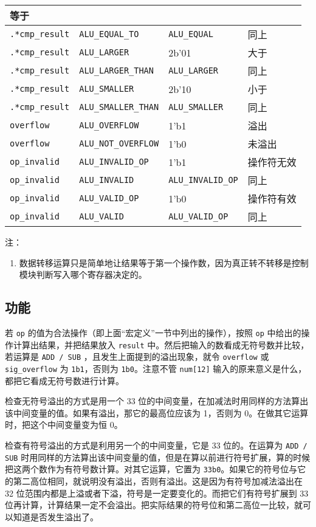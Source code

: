 \documentclass[12pt,AutoFakeBold,AutoFakeSlant]{article}
\providecommand{\tightlist}{%
  \setlength{\itemsep}{0pt}\setlength{\parskip}{0pt}}
\newcommand{\ms}[1]{\texttt{#1}}
\begin{document}
\begin{longtable}[]{@{}|l|l|l|l|@{}}
等于\tabularnewline\hline
\texttt{.*cmp\_result} & \texttt{ALU\_EQUAL\_TO} & \texttt{ALU\_EQUAL} &
同上\tabularnewline\hline
\texttt{.*cmp\_result} & \texttt{ALU\_LARGER} & 2b'01 &
大于\tabularnewline\hline
\texttt{.*cmp\_result} & \texttt{ALU\_LARGER\_THAN} &
\texttt{ALU\_LARGER} & 同上\tabularnewline\hline
\texttt{.*cmp\_result} & \texttt{ALU\_SMALLER} & 2b'10 &
小于\tabularnewline\hline
\texttt{.*cmp\_result} & \texttt{ALU\_SMALLER\_THAN} &
\texttt{ALU\_SMALLER} & 同上\tabularnewline\hline
\texttt{overflow} & \texttt{ALU\_OVERFLOW} & 1'b1 & 溢出\tabularnewline\hline
\texttt{overflow} & \texttt{ALU\_NOT\_OVERFLOW} & 1'b0 &
未溢出\tabularnewline\hline
\texttt{op\_invalid} & \texttt{ALU\_INVALID\_OP} & 1'b1 &
操作符无效\tabularnewline\hline
\texttt{op\_invalid} & \texttt{ALU\_INVALID} & \texttt{ALU\_INVALID\_OP}
& 同上\tabularnewline\hline
\texttt{op\_invalid} & \texttt{ALU\_VALID\_OP} & 1'b0 &
操作符有效\tabularnewline\hline
\texttt{op\_invalid} & \texttt{ALU\_VALID} & \texttt{ALU\_VALID\_OP} &
同上\tabularnewline\hline

\end{longtable}

注：

\begin{enumerate}
\def\labelenumi{\arabic{enumi}.}
\tightlist
\item
  数据转移运算只是简单地让结果等于第一个操作数，因为真正转不转移是控制模块判断写入哪个寄存器决定的。
\end{enumerate}

\hypertarget{ux529fux80fd-7}{%
\subsection{功能}\label{ux529fux80fd-7}}

若 \texttt{op} 的值为合法操作（即上面``宏定义''一节中列出的操作），按照
\texttt{op} 中给出的操作计算出结果，并把结果放入 \texttt{result}
中。然后把输入的数看成无符号数并比较，若运算是 \ms{ADD / SUB} ，且发生上面提到的溢出现象，就令
\texttt{overflow} 或 \texttt{sig\_overflow} 为
\texttt{1\textquotesingle{}b1}，否则为
\texttt{1\textquotesingle{}b0}。注意不管 \texttt{num{[}12{]}}
输入的原来意义是什么，都把它看成无符号数进行计算。

检查无符号溢出的方式是用一个 33 位的中间变量，在加减法时用同样的方法算出该中间变量的值。如果有溢出，那它的最高位应该为 1，否则为 0。在做其它运算时，把这个中间变量变为恒 0。

检查有符号溢出的方式是利用另一个的中间变量，它是 33
位的。在运算为 \ms{ADD / SUB} 时用同样的方法算出该中间变量的值，但是在算以前进行符号扩展，算的时候把这两个数作为有符号数计算。对其它运算，它置为 \texttt{33\textquotesingle{}b0}。如果它的符号位与它的第二高位相同，就说明没有溢出，否则有溢出。这是因为有符号加减法溢出在 32 位范围内都是上溢或者下溢，符号是一定要变化的。而把它们有符号扩展到 33 位再计算，计算结果一定不会溢出。把实际结果的符号位和第二高位一比较，就可以知道是否发生溢出了。
\end{document}
